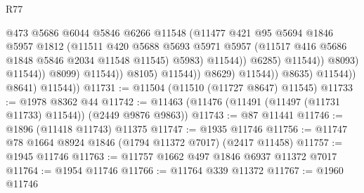 \begin{lexlean}{R77}
\begin{coremodule}
                                                @473
                                                @5686
                                                @6044
                                                @5846
                                                @6266
                                                @11548
                                                (@11477
                                                  @421
                                                  @95
                                                  @5694
                                                  @1846
                                                  @5957
                                                  @1812
                                                  (@11511
                                                    @420
                                                    @5688
                                                    @5693
                                                    @5971
                                                    @5957
                                                    (@11517
                                                      @416
                                                      @5686
                                                      @1848
                                                      @5846
                                                      @2034
                                                      @11548
                                                      @11545)
                                                    @5983)
                                                  @11544))
                                              @6285)
                                            @11544))
                                        @8093)
                                      @11544))
                                  @8099)
                                @11544))
                            @8105)
                          @11544))
                      @8629)
                    @11544))
                @8635)
              @11544))
          @8641)
        @11544))
@11731 := @11504 (@11510 (@11727 @8647) @11545)
@11733 := @1978 @8362 @44
@11742 := @11463 (@11476 (@11491 (@11497 (@11731 @11733) @11544)) (@2449 @9876 @9863))
@11743 := @87 @11441
@11746 := @1896 (@11418 @11743) @11375
@11747 := @1935 @11746
@11756 := @11747 @78 @1664 @8924 @1846 (@1794 @11372 @7017) (@2417 @11458)
@11757 := @1945 @11746
@11763 := @11757 @1662 @497 @1846 @6937 @11372 @7017
@11764 := @1954 @11746
@11766 := @11764 @339 @11372
@11767 := @1960 @11746

\end{coremodule}
\end{lexlean}
